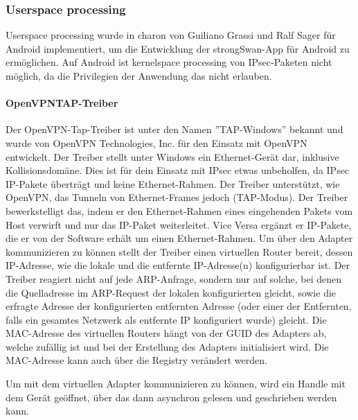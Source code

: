 \subsubsection{Userspace processing}
Userspace processing wurde in charon von Guiliano Grassi und Ralf Sager für Android implementiert,
um die Entwicklung der strongSwan-App für Android zu ermöglichen. Auf Android ist kernelspace processing
von \ac{IPsec}-Paketen nicht möglich, da die Privilegien der Anwendung das nicht erlauben.

\paragraph{OpenVPNTAP-Treiber}
Der OpenVPN-Tap-Treiber ist unter den Namen ''TAP-Windows'' bekannt und wurde von
OpenVPN Technologies, Inc. für den Einsatz mit OpenVPN entwickelt.
Der Treiber stellt unter Windows ein Ethernet-Gerät dar, inklusive Kollisionsdomäne.
Dies ist für dein Einsatz mit \ac{IPsec} etwas unbeholfen, da \ac{IPsec} \ac{IP}-Pakete
überträgt und keine Ethernet-Rahmen.
Der Treiber unterstützt, wie OpenVPN, das Tunneln von Ethernet-Frames jedoch (TAP-Modus).
Der Treiber bewerkstelligt das, indem er den Ethernet-Rahmen eines eingehenden Pakets vom
Host verwirft und nur das IP-Paket weiterleitet. Vice Versa ergänzt er IP-Pakete, die er von
der Software erhält um einen Ethernet-Rahmen. Um über den Adapter kommunizieren zu können
stellt der Treiber einen virtuellen Router bereit, dessen \ac{IP}-Adresse, wie die lokale  und
die entfernte IP-Adresse(n) konfigurierbar ist.
Der Treiber reagiert nicht auf jede ARP-Anfrage, sondern nur auf solche, bei denen
die Quelladresse im ARP-Request der lokalen konfigurierten gleicht, sowie die erfragte Adresse
der konfigurierten entfernten Adresse (oder einer der Entfernten, falls ein gesamtes Netzwerk
als entfernte IP konfiguriert wurde) gleicht.
Die MAC-Adresse des virtuellen Routers hängt von der GUID des Adapters ab, welche zufällig ist
und bei der Erstellung des Adapters initialisiert wird. Die MAC-Adresse kann 
auch über die Registry verändert werden.

Um mit dem virtuellen Adapter kommunizieren zu können, wird ein Handle mit dem Gerät
geöffnet, über das dann asynchron gelesen und geschrieben werden kann.


